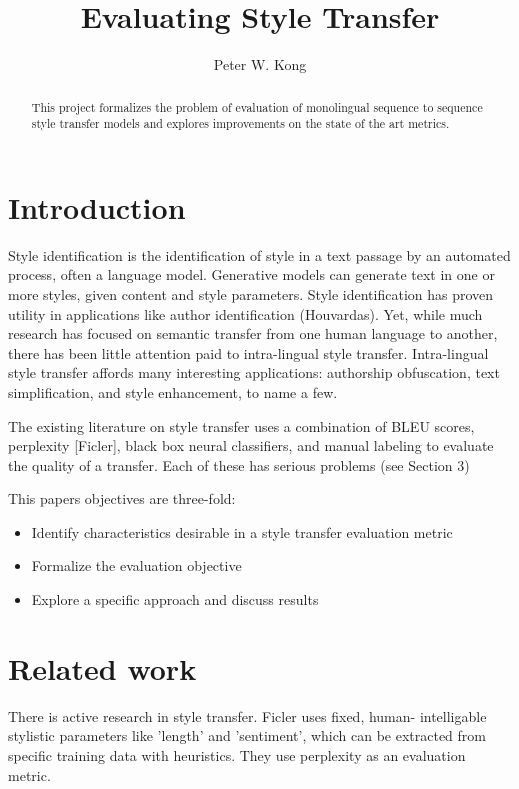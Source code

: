 \documentclass[letterpaper, 10 pt, conference]{ieeeconf}  %
\title{\LARGE \bf
Evaluating Style Transfer
}
\author{Peter W. Kong}
\begin{document}
\maketitle
\thispagestyle{empty}
\pagestyle{empty}

\begin{abstract}

This project formalizes the problem of evaluation of monolingual sequence to sequence style transfer models and explores improvements on the state of the art metrics.

\end{abstract}

\section{Introduction}
Style identification is the identification of style in a text passage by an automated process, often a language model. Generative models can generate text in one or more styles, given content and style parameters. Style identification has proven utility in applications like author identification (Houvardas). Yet, while much research has focused on semantic transfer from one human language to another, there has been little attention paid to intra-lingual style transfer. Intra-lingual style transfer affords many interesting applications: authorship obfuscation, text simplification, and style enhancement, to name a few.

The existing literature on style transfer uses a combination of BLEU scores, perplexity [Ficler], black box neural classifiers, and manual labeling to evaluate the quality of a transfer. Each of these has serious problems (see Section 3)


This paper\textquotesingle s objectives are three-fold:
\begin{itemize}
    \item Identify characteristics desirable in a style transfer evaluation metric
    \item Formalize the evaluation objective
    \item Explore a specific approach and discuss results
\end{itemize} 
\section{Related work}

There is active research in style transfer. Ficler uses fixed, human- intelligable stylistic parameters like ’length’ and ’sentiment’, which can be extracted from specific training data with heuristics. They use perplexity as an evaluation metric.
\\ 
\end{document}

